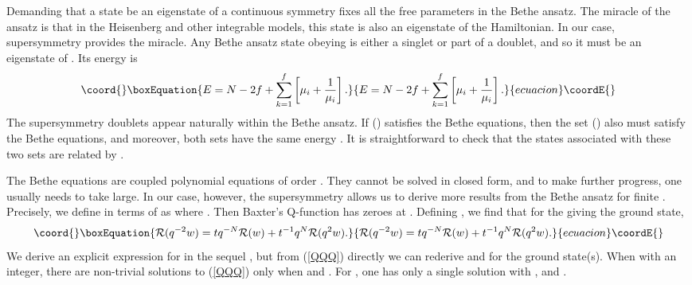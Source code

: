 \documentclass[a4paper,prl,aps,twocolumn]{revtex4}
\begin{document}
Demanding that a state be an eigenstate of a continuous symmetry
fixes all the free parameters in the Bethe
ansatz. The miracle of the ansatz is that in the Heisenberg 
and other integrable models, this state is also an eigenstate of the
Hamiltonian. In our case, supersymmetry provides the miracle. 
Any Bethe ansatz state obeying \coordHE{} is either a singlet
or part of a doublet, and so it must be an eigenstate of \coordHE{}. 
Its energy is
\begin{equation}\coord{}\boxEquation{  
E= N-2f + \sum_{k=1}^f \left[\mu_i + \frac{1}{\mu_i}\right].  
\label{energy}  
}{  
E= N-2f + \sum_{k=1}^f \left[\mu_i + \frac{1}{\mu_i}\right].  
}{ecuacion}\coordE{}\end{equation}  
The supersymmetry doublets appear naturally within  
the Bethe ansatz. If (\coordHE{}) satisfies the Bethe  
equations, then the set (\coordHE{}) also must satisfy the  
Bethe equations, and moreover, both sets have the same energy \coordHE{}.  It  
is straightforward to check that the states associated with these two
sets are related by \coordHE{}.
  
The Bethe equations are \coordHE{} coupled polynomial equations of order \coordHE{}.  
They cannot be solved in closed form, and to make further progress,  
one usually needs to take \coordHE{} large. In our case, however, the  
supersymmetry allows us to derive more results from the Bethe ansatz  
for finite \coordHE{}.  Precisely, we define \coordHE{} in terms of \coordHE{} as
\coordHE{}  
where \coordHE{}. Then Baxter's Q-function 
\cite{Baxter} \coordHE{} has
zeroes at \coordHE{}. 
Defining \coordHE{}, we find that   
for the \coordHE{} giving the ground state,
\begin{equation}\coord{}\boxEquation{  
{\cal R}(q^{-2}w) = t q^{-N}{\cal R}(w) +   
t^{-1} q^N {\cal R}(q^2 w).  
\label{QQQ}  
}{  
{\cal R}(q^{-2}w) = t q^{-N}{\cal R}(w) +   
t^{-1} q^N {\cal R}(q^2 w).  
}{ecuacion}\coordE{}\end{equation}
We derive an explicit expression for
\coordHE{} in the sequel \cite{FSii}, but from (\ref{QQQ}) directly
we can rederive \coordHE{} and \coordHE{} for the ground state(s).
When \coordHE{} with \coordHE{} an integer,  
there are non-trivial solutions to (\ref{QQQ}) only when  
\coordHE{} and \coordHE{}. For \coordHE{},   
one has only a single solution with \coordHE{}, and  
\coordHE{}. 
\end{document}
